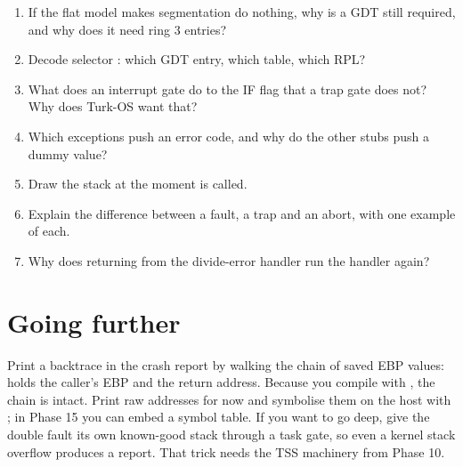 \documentclass[11pt,a4paper]{article}
\begin{document}
\begin{questionbox}
\begin{enumerate}
  \item If the flat model makes segmentation do nothing, why is a GDT still required, and why does it need ring 3 entries?
  \item Decode selector : which GDT entry, which table, which RPL?
  \item What does an interrupt gate do to the IF flag that a trap gate does not? Why does Turk-OS want that?
  \item Which exceptions push an error code, and why do the other stubs push a dummy value?
  \item Draw the stack at the moment  is called.
  \item Explain the difference between a fault, a trap and an abort, with one example of each.
  \item Why does returning from the divide-error handler run the handler again?
\end{enumerate}
\end{questionbox}

\section{Going further}

Print a backtrace in the crash report by walking the chain of saved EBP values: \code{[ebp]} holds the caller's EBP and
\code{[ebp+4]} the return address. Because you compile with , the chain is intact. Print
raw addresses for now and symbolise them on the host with ; in Phase 15 you can embed a symbol table.
If you want to go deep, give the double fault its own known-good stack through a task gate, so even a kernel stack
overflow produces a report. That trick needs the TSS machinery from Phase 10.

\booklegend
\end{document}
